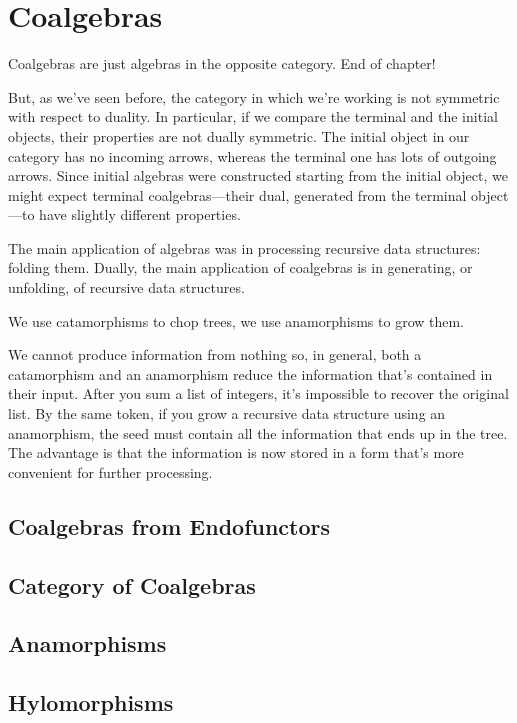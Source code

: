 \documentclass[DaoFP]{subfiles}
\begin{document}
\setcounter{chapter}{11}

\chapter{Coalgebras}

Coalgebras are just algebras in the opposite category. End of chapter!

But, as we've seen before, the category in which we're working is not symmetric with respect to duality. In particular, if we compare the terminal and the initial objects, their properties are not dually symmetric. The initial object in our category has no incoming arrows, whereas the terminal one has lots of outgoing arrows. Since initial algebras were constructed starting from the initial object, we might expect terminal coalgebras---their dual, generated from the terminal object---to have slightly different properties.

The main application of algebras was in processing recursive data structures: folding them. Dually, the main application of coalgebras is in generating, or unfolding, of recursive data structures. 

We use catamorphisms to chop trees, we use anamorphisms to grow them. 

We cannot produce information from nothing so, in general, both a catamorphism and an anamorphism reduce the information that's contained in their input. After you sum a list of integers, it's impossible to recover the original list. By the same token, if you grow a recursive data structure using an anamorphism, the seed must contain all the information that ends up in the tree. The advantage is that the information is now stored in a form that's more convenient for further processing.

\section{Coalgebras from Endofunctors}

\section{Category of Coalgebras}

\section{Anamorphisms}

\section{Hylomorphisms}
\end{document}
